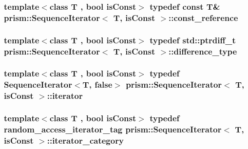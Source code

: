 \subsubsection[{\texorpdfstring{const\+\_\+reference}{const_reference}}]{\setlength{\rightskip}{0pt plus 5cm}template$<$class T , bool is\+Const$>$ typedef const T\& {\bf prism\+::\+Sequence\+Iterator}$<$ T, is\+Const $>$\+::{\bf const\+\_\+reference}}\hypertarget{structprism_1_1_sequence_iterator_a7739d968cd075878171e063d7a60d2e2}{}\label{structprism_1_1_sequence_iterator_a7739d968cd075878171e063d7a60d2e2}
\subsubsection[{\texorpdfstring{difference\+\_\+type}{difference_type}}]{\setlength{\rightskip}{0pt plus 5cm}template$<$class T , bool is\+Const$>$ typedef std\+::ptrdiff\+\_\+t {\bf prism\+::\+Sequence\+Iterator}$<$ T, is\+Const $>$\+::{\bf difference\+\_\+type}}\hypertarget{structprism_1_1_sequence_iterator_a256c83c7b6da801b16778f39697e8db3}{}\label{structprism_1_1_sequence_iterator_a256c83c7b6da801b16778f39697e8db3}
\subsubsection[{\texorpdfstring{iterator}{iterator}}]{\setlength{\rightskip}{0pt plus 5cm}template$<$class T , bool is\+Const$>$ typedef {\bf Sequence\+Iterator}$<$T, false$>$ {\bf prism\+::\+Sequence\+Iterator}$<$ T, is\+Const $>$\+::{\bf iterator}}\hypertarget{structprism_1_1_sequence_iterator_ac791d493ea5fafcc435a83dbe2385a1e}{}\label{structprism_1_1_sequence_iterator_ac791d493ea5fafcc435a83dbe2385a1e}
\subsubsection[{\texorpdfstring{iterator\+\_\+category}{iterator_category}}]{\setlength{\rightskip}{0pt plus 5cm}template$<$class T , bool is\+Const$>$ typedef {\bf random\+\_\+access\+\_\+iterator\+\_\+tag} {\bf prism\+::\+Sequence\+Iterator}$<$ T, is\+Const $>$\+::{\bf iterator\+\_\+category}}\hypertarget{structprism_1_1_sequence_iterator_a8525d9ddbb07664ddab39df5d6d72b03}{}\label{structprism_1_1_sequence_iterator_a8525d9ddbb07664ddab39df5d6d72b03}
